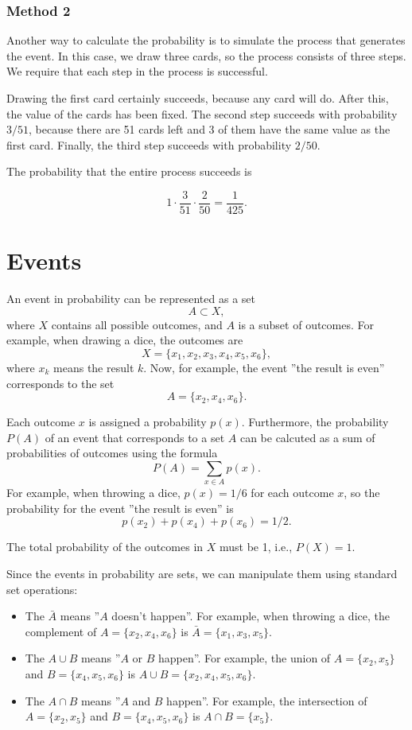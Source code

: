 \subsubsection*{Method 2}

Another way to calculate the probability is
to simulate the process that generates the event.
In this case, we draw three cards, so the process
consists of three steps.
We require that each step in the process is successful.

Drawing the first card certainly succeeds,
because any card will do.
After this, the value of the cards has been fixed.
The second step succeeds with probability $3/51$,
because there are 51 cards left and 3 of them
have the same value as the first card.
Finally, the third step succeeds with probability $2/50$.

The probability that the entire process succeeds is

\[1 \cdot \frac{3}{51} \cdot \frac{2}{50} = \frac{1}{425}.\]

\section{Events}

An event in probability can be represented as a set
\[A \subset X,\]
where $X$ contains all possible outcomes,
and $A$ is a subset of outcomes.
For example, when drawing a dice, the outcomes are
\[X = \{x_1,x_2,x_3,x_4,x_5,x_6\},\]
where $x_k$ means the result $k$.
Now, for example, the event ''the result is even''
corresponds to the set
\[A = \{x_2,x_4,x_6\}.\]

Each outcome $x$ is assigned a probability $p(x)$.
Furthermore, the probability $P(A)$ of an event
that corresponds to a set $A$ can be calcuted as a sum
of probabilities of outcomes using the formula
\[P(A) = \sum_{x \in A} p(x).\]
For example, when throwing a dice,
$p(x)=1/6$ for each outcome $x$,
so the probability for the event
''the result is even'' is
\[p(x_2)+p(x_4)+p(x_6)=1/2.\]

The total probability of the outcomes in $X$ must
be 1, i.e., $P(X)=1$.

Since the events in probability are sets,
we can manipulate them using standard set operations:

\begin{itemize}
\item The  $\bar A$ means
''$A$ doesn't happen''.
For example, when throwing a dice, 
the complement of $A=\{x_2,x_4,x_6\}$ is
$\bar A = \{x_1,x_3,x_5\}$.
\item The  $A \cup B$ means
''$A$ or $B$ happen''.
For example, the union of
$A=\{x_2,x_5\}$
and $B=\{x_4,x_5,x_6\}$ is
$A \cup B = \{x_2,x_4,x_5,x_6\}$.
\item The  $A \cap B$ means
''$A$ and $B$ happen''.
For example, the intersection of
$A=\{x_2,x_5\}$ and $B=\{x_4,x_5,x_6\}$ is
$A \cap B = \{x_5\}$.
\end{itemize}

